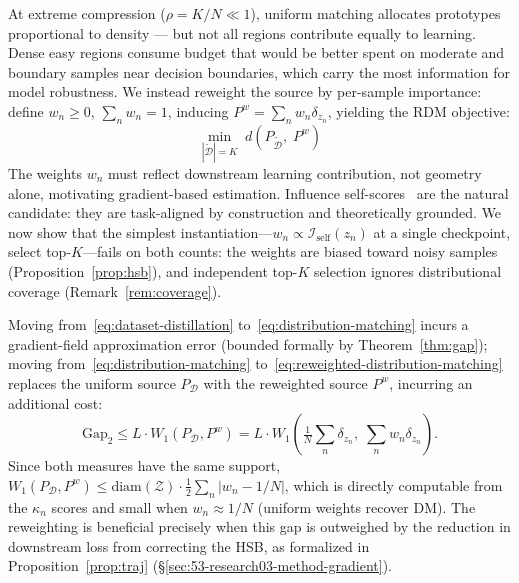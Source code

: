 \begin{foldable} %
    At extreme compression ($\rho = K/N \ll 1$), uniform matching allocates prototypes proportional to density --- but not all regions contribute equally to learning.
    Dense easy regions consume budget that would be better spent on moderate and boundary samples near decision boundaries, which carry the most information for model robustness.
    We instead reweight the source by per-sample importance: define $w_n \geq 0$, $\sum_n w_n = 1$, inducing $P^w = \sum_n w_n \delta_{z_n}$, yielding the \ac{RDM} objective:
    \begin{equation}
        \min_{|\tilde{\mathcal{D}}| = K}\; d\!\left(P_{\tilde{\mathcal{D}}},\; P^w\right)
        \label{eq:reweighted-distribution-matching}
    \end{equation}
    The weights $w_n$ must reflect downstream learning contribution, not geometry alone, motivating gradient-based estimation.
    Influence self-scores~\cite{koh2017understanding} are the natural candidate: they are task-aligned by construction and theoretically grounded.
    We now show that the simplest instantiation---$w_n \propto \mathcal{I}_\text{self}(z_n)$ at a single checkpoint, select top-$K$---fails on both counts: the weights are biased toward noisy samples (Proposition~\ref{prop:hsb}), and independent top-$K$ selection ignores distributional coverage (Remark~\ref{rem:coverage}).
    \begin{remark} \label{rem:double-gap}
        Moving from~\eqref{eq:dataset-distillation} to~\eqref{eq:distribution-matching} incurs a gradient-field approximation error (bounded formally by Theorem~\ref{thm:gap}); moving from~\eqref{eq:distribution-matching} to~\eqref{eq:reweighted-distribution-matching} replaces the uniform source $P_\mathcal{D}$ with the reweighted source $P^w$, incurring an additional cost:
        \begin{equation}
            \text{Gap}_2 \leq L \cdot W_1(P_\mathcal{D}, P^w) = L \cdot W_1\!\left(\tfrac{1}{N}\textstyle\sum_n \delta_{z_n},\; \textstyle\sum_n w_n \delta_{z_n}\right).
            \label{eq:gap2}
        \end{equation}
        Since both measures have the same support, $W_1(P_\mathcal{D}, P^w) \leq \text{diam}(\mathcal{Z}) \cdot \frac{1}{2}\sum_n |w_n - 1/N|$, which is directly computable from the $\kappa_n$ scores and small when $w_n \approx 1/N$ (uniform weights recover DM).
        The reweighting is beneficial precisely when this gap is outweighed by the reduction in downstream loss from correcting the \ac{HSB}, as formalized in Proposition~\ref{prop:traj} (\S\ref{sec:53-research03-method-gradient}).
    \end{remark}
\end{foldable}


